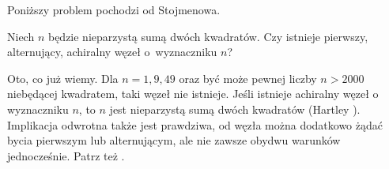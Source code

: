 Poniższy problem pochodzi od Stojmenowa.
%

\begin{conjecture}
    Niech $n$ będzie nieparzystą sumą dwóch kwadratów.
    Czy istnieje pierwszy, alternujący, achiralny węzeł o~wyznaczniku $n$?
\end{conjecture}

Oto, co już wiemy.
Dla $n = 1, 9, 49$ oraz być może pewnej liczby $n > 2000$ niebędącej kwadratem, taki węzeł nie istnieje.
Jeśli istnieje achiralny węzeł o wyznaczniku $n$, to $n$ jest nieparzystą sumą dwóch kwadratów (Hartley \cite{hartley79}).
%
Implikacja odwrotna także jest prawdziwa, od węzła można dodatkowo żądać bycia pierwszym lub alternującym, ale nie zawsze obydwu warunków jednocześnie.
Patrz też \cite{stoimenow05}.
%



